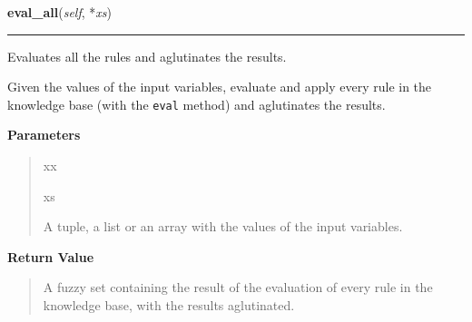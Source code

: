     \label{peach:fuzzy:control:Controller:eval_all}

    \vspace{0.5ex}

    \begin{boxedminipage}{\textwidth}

    \raggedright \textbf{eval\_all}(\textit{self}, *\textit{xs})

    \vspace{-1.5ex}

    \rule{\textwidth}{0.5\fboxrule}

Evaluates all the rules and aglutinates the results.

Given the values of the input variables, evaluate and apply every rule
in the knowledge base (with the \texttt{eval} method) and aglutinates the
results.
    \vspace{1ex}

      \textbf{Parameters}
      \begin{quote}
        \begin{Ventry}{xx}

          \item[xs]


A tuple, a list or an array with the values of the input variables.
        \end{Ventry}

      \end{quote}

    \vspace{1ex}

      \textbf{Return Value}
      \begin{quote}

A fuzzy set containing the result of the evaluation of every rule in
the knowledge base, with the results aglutinated.
      \end{quote}

    \vspace{1ex}

    \end{boxedminipage}

    \label{peach:fuzzy:control:Controller:__call__}

